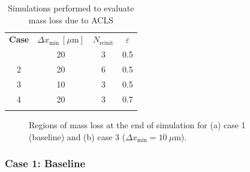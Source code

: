 \begin{table}[!h]
\centering
\caption{Simulations performed to evaluate mass loss due to ACLS}
\begin{tabular}{cccc}
\thickhline
\textbf{Case} & $\Delta x_\mathrm{min} ~ [\mu \mathrm{m}]$ & $N_\mathrm{reinit}$ &  $\varepsilon$ \\
\thickhline
1 & 20 & 3 & 0.5 \\
2 & 20 & 6 & 0.5 \\
3 & 10 & 3 & 0.5 \\
4 & 20 & 3 & 0.7 \\
\thickhline
\end{tabular}
\label{tab:jicf_simulations_mass_loss_set_levelset_band}
\end{table}

%

\begin{figure}[h!]
	\centering
	\caption{Regions of mass loss at the end of simulation for (a) case 1 (baseline) and (b) case 3 ($\Delta x_\mathrm{min} = 10~\mu$m).}	\label{fig:jicf_mass_loss_baseline_and_dx10}
\end{figure}

\subsubsection*{Case 1: Baseline }

